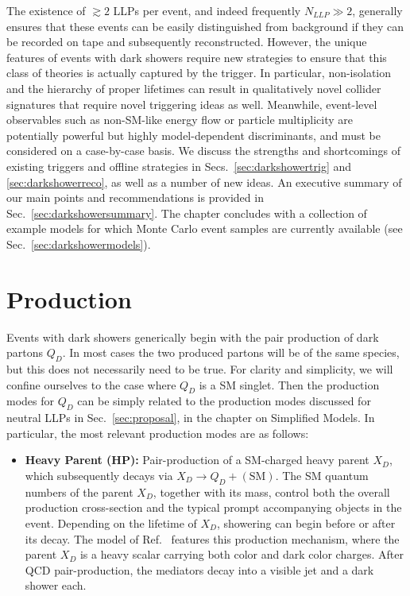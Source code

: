 \begin{enumerate}
\begin {enumerate}
\end {enumerate}

The existence of $\gtrsim 2$ LLPs per event, and indeed frequently $N_{LLP}\gg 2$, generally ensures that these events can be easily distinguished from background if they can be recorded on tape and subsequently reconstructed. However, the unique features of events with dark showers require new strategies to ensure that this class of theories is actually captured by the trigger. In particular, non-isolation and the hierarchy of proper lifetimes can result in qualitatively novel collider signatures that require novel triggering ideas as well. Meanwhile, event-level observables such as non-SM-like energy flow or particle multiplicity are potentially powerful but highly model-dependent discriminants, and must be considered on a case-by-case basis. We discuss the strengths and shortcomings of existing triggers and offline strategies in Secs.~\ref{sec:darkshowertrig} and \ref{sec:darkshowerreco}, as well as a number of new ideas. An executive summary of our main points and recommendations is provided in Sec.~\ref{sec:darkshowersummary}. The chapter concludes with a collection of example models for which Monte Carlo event samples are currently available (see Sec.~\ref{sec:darkshowermodels}).

\section{Production}
\label{sec:darkshowerprod}

Events with dark showers generically begin with the pair production of dark partons $Q_D$. In most cases the two produced partons will be of the same species, but this does not necessarily need to be true. For clarity and simplicity, we will confine ourselves to the case where $Q_D$ is a SM singlet. Then the production modes for $Q_D$ can be simply related to the production modes discussed for neutral LLPs in Sec.~\ref{sec:proposal}, in the chapter on Simplified Models. In particular, the most relevant production modes are as follows:
%
\begin{itemize}

\item {\bf Heavy Parent (HP):} Pair-production of a SM-charged heavy parent $X_D$, which subsequently decays via $X_D\to Q_D+\mathrm{(SM)}$. The SM quantum numbers of the parent $X_D$, together with its mass, control both the overall production cross-section and the typical prompt accompanying objects in the event. Depending on the lifetime of $X_D$, showering can begin before or after its decay. The model of Ref.~\cite{Schwaller:2015gea} features this production mechanism, where the parent $X_D$ is a heavy scalar carrying both color and dark color charges. After QCD pair-production, the mediators decay into a visible jet and a dark shower each.


\end{itemize}
\end{enumerate}
